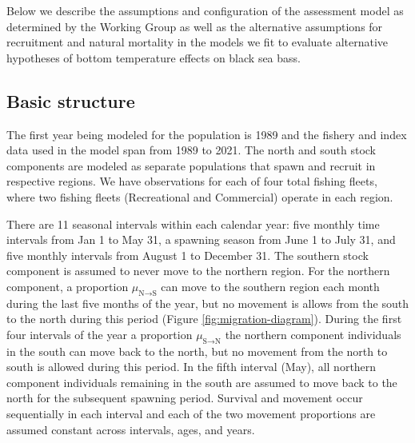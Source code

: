 \documentclass[
]{article}
\begin{document}
Below we describe the assumptions and configuration of the assessment
model as determined by the Working Group as well as the alternative
assumptions for recruitment and natural mortality in the models we fit
to evaluate alternative hypotheses of bottom temperature effects on
black sea bass.

\hypertarget{basic-structure}{%
\subsection*{Basic structure}\label{basic-structure}}

The first year being modeled for the population is 1989 and the fishery
and index data used in the model span from 1989 to 2021. The north and
south stock components are modeled as separate populations that spawn
and recruit in respective regions. We have observations for each of four
total fishing fleets, where two fishing fleets (Recreational and
Commercial) operate in each region.

There are 11 seasonal intervals within each calendar year: five monthly
time intervals from Jan 1 to May 31, a spawning season from June 1 to
July 31, and five monthly intervals from August 1 to December 31. The
southern stock component is assumed to never move to the northern
region. For the northern component, a proportion
\(\mu_{\text{N}\rightarrow \text{S}}\) can move to the southern region
each month during the last five months of the year, but no movement is
allows from the south to the north during this period (Figure
\ref{fig:migration-diagram}). During the first four intervals of the
year a proportion \(\mu_{\text{S}\rightarrow \text{N}}\) the northern
component individuals in the south can move back to the north, but no
movement from the north to south is allowed during this period. In the
fifth interval (May), all northern component individuals remaining in
the south are assumed to move back to the north for the subsequent
spawning period. Survival and movement occur sequentially in each
interval and each of the two movement proportions are assumed constant
across intervals, ages, and years.
\end{document}
